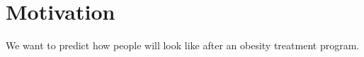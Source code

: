 \section{Motivation}

We want to predict how people will look like after an obesity treatment program.